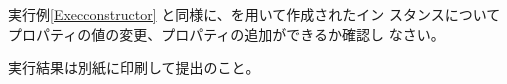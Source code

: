 \begin{Prob}\upshape
 実行例\else\ref{Execconstructor}\fi
 と同様に、を用いて作成されたイン
 スタンスについてプロパティの値の変更、プロパティの追加ができるか確認し
 なさい。
\end{Prob}
\ifText
実行結果は別紙に印刷して提出のこと。
\fi